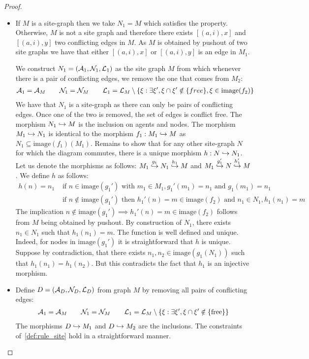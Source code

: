 \begin{proof}
  \begin{itemize}
  \item If $M$ is a site-graph then we take $N_1=M$ which satisfies the property. Otherwise, $M$ is not a site graph and therefore there exists $[(a,i),x]$ and $[(a,i),y]$ two conflicting edges in $M$. As $M$ is obtained by pushout of two site graphs we have that either $[(a,i),x]$ or $[(a,i),y]$ is an edge in $M_1$.

    We construct $N_1 = (\mathcal{A}_1,\mathcal{N}_1,\mathcal{L}_1)$ as the site graph $M$ from which whenever there is a pair of conflicting edges, we remove the one that comes from $M_2$:
    \begin{align*}
      \mathcal{A}_1 = \mathcal{A}_M\qquad
      \mathcal{N}_1 = \mathcal{N}_M\qquad
      \mathcal{L}_1 = \mathcal{L}_M\setminus \{ \xi: \exists\xi', \xi\cap \xi'\notin\{free\}, \xi\in\text{image}(f_2) \}
    \end{align*}
    We have that $N_1$ is a site-graph as there can only be pairs of conflicting edges. Once one of the two is removed, the set of edges is conflict free. The morphism $N_1\hookrightarrow M$ is the inclusion on agents and nodes. The morphism $M_1\hookrightarrow N_1$ is identical to the morphism $f_1:M_1\hookrightarrow M$ as $N_1\subseteq\text{image}(f_1)(M_1)$. Remains to show that for any other site-graph $N$ for which the diagram commutes, there is a unique morphism $h:N\hookrightarrow N_1$.
    Let us denote the morphisms as follows: $M_1\overset{g_1}{\hookrightarrow}N_1\overset{h_1}{\hookrightarrow} M$ and $M_1\overset{g_1'}{\hookrightarrow}N\overset{h_1'}{\hookrightarrow} M$.
    We define $h$ as follows:
    \begin{align*}
      h(n) = n_1&\text{ if }n\in\text{image}(g_1')\text{ with }m_1\in M_1,g_1'(m_1) = n_1\text{ and }g_1(m_1)=n_1\\
      &\text{ if }n\notin\text{image}(g_1')\text{ then }h_1'(n)=m\in\text{image}(f_2)\text{ and }n_1\in N_1,h_1(n_1) = m
    \end{align*}
    The implication $n\notin\text{image}(g_1')\implies h_1'(n)=m\in\text{image}(f_2)$ follows from $M$ being obtained by pushout. By construction of $N_1$, there exists $n_1\in N_1$ such that $h_1(n_1) = m$. The function is well defined and unique. Indeed, for nodes in $\text{image}(g_1')$ it is straightforward that $h$ is unique. Suppose by contradiction, that there exists $n_1, n_2 \in \text{image}(g_1(N_1))$ such that $h_1(n_1)=h_1(n_2)$. But this contradicts the fact that $h_1$ is an injective morphism.

  \item Define $D=(\mathcal{A}_D,\mathcal{N}_D,\mathcal{L}_D)$ from graph $M$ by removing all pairs of conflicting edges:
    \begin{align*}
      \mathcal{A}_1 = \mathcal{A}_M\qquad
      \mathcal{N}_1 = \mathcal{N}_M\qquad
      \mathcal{L}_1 = \mathcal{L}_M\setminus \{ \xi: \exists\xi', \xi\cap \xi'\notin\{\text{free}\} \}
    \end{align*}
    The morphisms $D\hookrightarrow M_1$ and $D\hookrightarrow M_2$ are the inclusions. The constraints of~\autoref{def:rule_site} hold in a straightforward manner.
  \end{itemize}
\end{proof}
